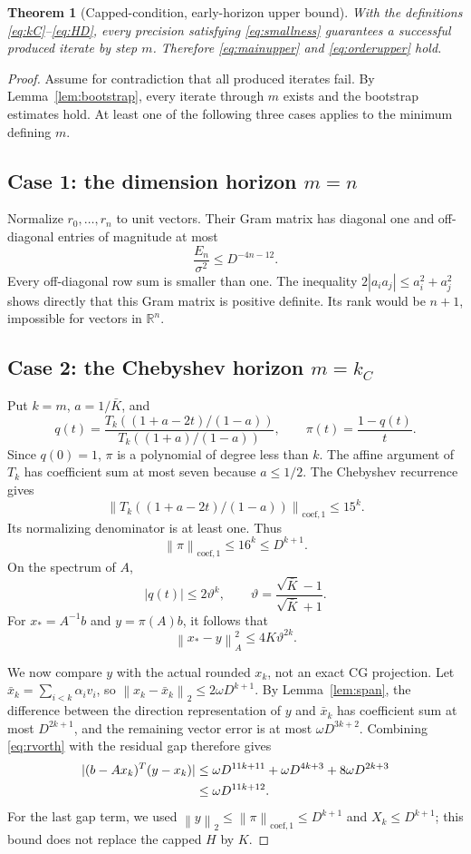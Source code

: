 \documentclass[11pt]{article}
\newtheorem{theorem}{Theorem}[section]
\theoremstyle{remark}\newtheorem{remark}[theorem]{Remark}
\newcommand{\R}{\mathbb R}
\newcommand{\norm}[1]{\left\lVert#1\right\rVert_2}
\newcommand{\coefnorm}[1]{\left\lVert#1\right\rVert_{\mathrm{coef},1}}
\newcommand{\energy}[1]{\left\lVert#1\right\rVert_A}
\begin{document}
\begin{theorem}[Capped-condition, early-horizon upper bound]\label{thm:main}
With the definitions \eqref{eq:kC}--\eqref{eq:HD}, every precision
satisfying \eqref{eq:smallness} guarantees a successful produced iterate
by step $m$. Therefore \eqref{eq:mainupper} and \eqref{eq:orderupper} hold.
\end{theorem}

\begin{proof}
Assume for contradiction that all produced iterates fail. By
Lemma~\ref{lem:bootstrap}, every iterate through $m$ exists and the
bootstrap estimates hold. At least one of the following three cases
applies to the minimum defining $m$.

\subsection*{Case 1: the dimension horizon $m=n$}
Normalize $r_0,\ldots,r_n$ to unit vectors. Their Gram matrix has diagonal
one and off-diagonal entries of magnitude at most
\[
\frac{E_n}{\sigma^2}\le D^{-4n-12}.
\]
Every off-diagonal row sum is smaller than one. The inequality
$2|a_i a_j|\le a_i^2+a_j^2$ shows directly that this Gram matrix is
positive definite. Its rank would be $n+1$, impossible for vectors in
$\R^n$.

\subsection*{Case 2: the Chebyshev horizon $m=k_C$}
Put $k=m$, $a=1/\bar K$, and
\[
q(t)=\frac{T_k((1+a-2t)/(1-a))}{T_k((1+a)/(1-a))},\qquad
\pi(t)=\frac{1-q(t)}t.
\]
Since $q(0)=1$, $\pi$ is a polynomial of degree less than $k$.
The affine argument of $T_k$ has coefficient sum at most seven because
$a\le1/2$. The Chebyshev recurrence gives
\[
\coefnorm{T_k((1+a-2t)/(1-a))}\le15^k.
\]
Its normalizing denominator is at least one. Thus
\[
\coefnorm\pi\le16^k\le D^{k+1}.
\]
On the spectrum of $A$,
\[
|q(t)|\le2\vartheta^k,\qquad
\vartheta=\frac{\sqrt{\bar K}-1}{\sqrt{\bar K}+1}.
\]
For $x_*=A^{-1}b$ and $y=\pi(A)b$, it follows that
\begin{equation}\label{eq:exactenergy}
\energy{x_*-y}^2\le4K\vartheta^{2k}.
\end{equation}

We now compare $y$ with the actual rounded $x_k$, not an exact CG
projection. Let $\bar x_k=\sum_{i<k}\alpha_i v_i$, so
$\norm{x_k-\bar x_k}\le2\omega D^{k+1}$.
By Lemma~\ref{lem:span}, the difference between the direction
representation of $y$ and $\bar x_k$ has coefficient sum at most
$D^{2k+1}$, and the remaining vector error is at most
$\omega D^{3k+2}$. Combining \eqref{eq:rvorth} with the residual gap
therefore gives
\begin{align}
|(b-Ax_k)^T(y-x_k)|
&\le\omega D^{11k+11}+\omega D^{4k+3}
     +8\omega D^{2k+3}\notag\\
&\le\omega D^{11k+12}.\label{eq:crossbound}
\end{align}
For the last gap term, we used
$\norm y\le\coefnorm\pi\le D^{k+1}$ and $X_k\le D^{k+1}$;
this bound does not replace the capped $H$ by $K$.


\end{proof}
\end{document}
